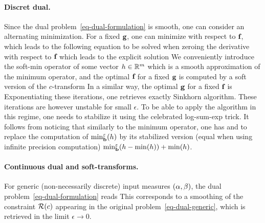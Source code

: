 \paragraph{Discret dual.}

Since the dual problem~\eqref{eq-dual-formulation} is smooth, one can consider an alternating minimization. For a fixed $\mathrm{\textbf{\upshape g}}$, one can minimize with respect to $\mathrm{\textbf{\upshape f}}$, which leads to the following equation to be solved when zeroing the derivative with respect to $\mathrm{\textbf{\upshape f}}$ 
which leads to the explicit solution 
We conveniently introduce the soft-min operator of some vector $h \in \mathbb{R}^m$
which is a smooth approximation of the minimum operator, and the optimal $\mathrm{\textbf{\upshape f}}$ for a fixed $\mathrm{\textbf{\upshape g}}$ is computed by a soft version of the $c$-transform
In a similar way, the optimal $\mathrm{\textbf{\upshape g}}$ for a fixed $\mathrm{\textbf{\upshape f}}$ is
Exponentiating these iterations, one retrieves exactly Sinkhorn algorithm. These iterations are however unstable for small $\epsilon$. To be able to apply the algorithm in this regime, one needs to stabilize it using the celebrated log-sum-exp trick. It follows from noticing that similarly to the minimum operator, one has 
and to replace the computation of ${\min}_{\mathrm{\textbf{\upshape b}}}^\varepsilon(h)$ by its stabilized version (equal when using infinite precision computation) ${\min}_{\mathrm{\textbf{\upshape b}}}^\varepsilon(h-\min(h)) +  \min(h)$. 
\paragraph{Continuous dual and soft-transforms.}

For generic (non-necessarily discrete) input measures $(\alpha,\beta)$, the dual problem~\eqref{eq-dual-formulation} reads
This corresponds to a smoothing of the constraint $\mathcal{R}(c)$ appearing in the original problem~\eqref{eq-dual-generic}, which is retrieved in the limit $\epsilon \rightarrow 0$.

